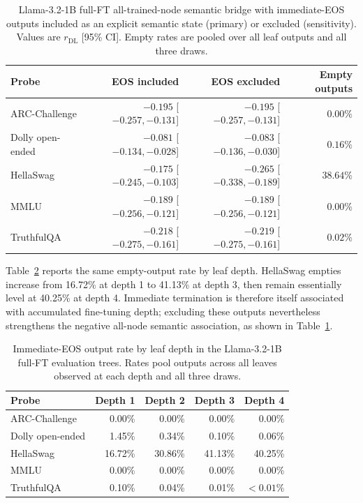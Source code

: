 \documentclass{article}
\theoremstyle{definition}
\theoremstyle{plain}
\begin{document}
\begin{table}[h]
\caption{Llama-3.2-1B full-FT all-trained-node semantic bridge with immediate-EOS outputs included as an explicit
  semantic state (primary) or excluded (sensitivity). Values are $r_{\mathrm{DL}}$ [95\% CI]. Empty
  rates are pooled over all leaf outputs and all three draws.}
\label{tab:eos-sensitivity}
\centering
\small
\begin{tabular}{lrrr}
\toprule
Probe & EOS included & EOS excluded & Empty outputs \\
\midrule
ARC-Challenge & $-0.195$ [$-0.257,-0.131$] & $-0.195$ [$-0.257,-0.131$] & $0.00\%$ \\
Dolly open-ended & $-0.081$ [$-0.134,-0.028$] & $-0.083$ [$-0.136,-0.030$] & $0.16\%$ \\
HellaSwag & $-0.175$ [$-0.245,-0.103$] & $-0.265$ [$-0.338,-0.189$] & $38.64\%$ \\
MMLU & $-0.189$ [$-0.256,-0.121$] & $-0.189$ [$-0.256,-0.121$] & $0.00\%$ \\
TruthfulQA & $-0.218$ [$-0.275,-0.161$] & $-0.219$ [$-0.275,-0.161$] & $0.02\%$ \\
\bottomrule
\end{tabular}
\end{table}

Table~\ref{tab:eos-depth} reports the same empty-output rate by leaf depth. HellaSwag empties increase
from 16.72\% at depth 1 to 41.13\% at depth 3, then remain essentially level at 40.25\% at depth 4. Immediate termination is therefore itself
associated with accumulated fine-tuning depth; excluding these outputs nevertheless strengthens the
negative all-node semantic association, as shown in Table~\ref{tab:eos-sensitivity}.

\begin{table}[h]
\caption{Immediate-EOS output rate by leaf depth in the Llama-3.2-1B full-FT evaluation trees. Rates
  pool outputs across all leaves observed at each depth and all three draws.}
\label{tab:eos-depth}
\centering
\small
\begin{tabular}{lrrrr}
\toprule
Probe & Depth 1 & Depth 2 & Depth 3 & Depth 4 \\
\midrule
ARC-Challenge & 0.00\% & 0.00\% & 0.00\% & 0.00\% \\
Dolly open-ended & 1.45\% & 0.34\% & 0.10\% & 0.06\% \\
HellaSwag & 16.72\% & 30.86\% & 41.13\% & 40.25\% \\
MMLU & 0.00\% & 0.00\% & 0.00\% & 0.00\% \\
TruthfulQA & 0.10\% & 0.04\% & 0.01\% & $<0.01\%$ \\
\bottomrule
\end{tabular}
\end{table}
\end{document}
